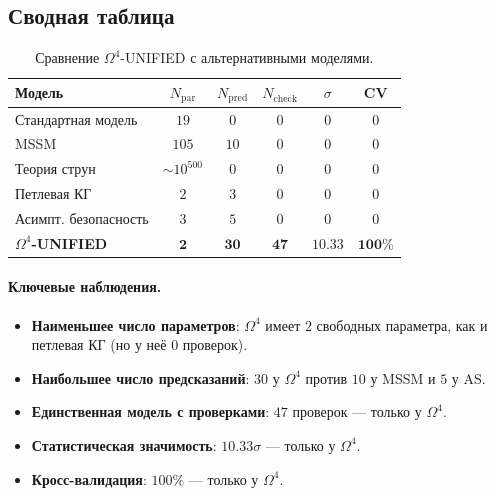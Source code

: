 \documentclass[11pt,a4paper]{article}
\newcommand{\Om}{\Omega^4}
\theoremstyle{definition}
\begin{document}
\subsection{Сводная таблица}
\label{subsec:benchmark-table}

\begin{table}[htbp]
\centering
\caption{Сравнение $\Om$-UNIFIED с альтернативными моделями.}
\label{tab:benchmark}
\begin{tabular}{lccccc}
\toprule
Модель & $N_{\text{par}}$ & $N_{\text{pred}}$ & $N_{\text{check}}$ 
& $\sigma$ & CV \\
\midrule
Стандартная модель & $19$ & $0$ & $0$ & $0$ & $0$ \\
MSSM & $105$ & $10$ & $0$ & $0$ & $0$ \\
Теория струн & $\sim 10^{500}$ & $0$ & $0$ & $0$ & $0$ \\
Петлевая КГ & $2$ & $3$ & $0$ & $0$ & $0$ \\
Асимпт. безопасность & $3$ & $5$ & $0$ & $0$ & $0$ \\
\midrule
\textbf{$\Om$-UNIFIED} & $\mathbf{2}$ & $\mathbf{30}$ & $\mathbf{47}$ 
& $\mathbf{10.33}$ & $\mathbf{100\%}$ \\
\bottomrule
\end{tabular}
\end{table}

\paragraph{Ключевые наблюдения.}
\begin{itemize}
    \item \textbf{Наименьшее число параметров}: 
          $\Om$ имеет $2$ свободных параметра, как и петлевая 
          КГ (но у неё 0 проверок).
    \item \textbf{Наибольшее число предсказаний}: 
          $30$ у $\Om$ против $10$ у MSSM и $5$ у AS.
    \item \textbf{Единственная модель с проверками}: 
          $47$ проверок — только у $\Om$.
    \item \textbf{Статистическая значимость}: 
          $10.33\sigma$ — только у $\Om$.
    \item \textbf{Кросс-валидация}: 
          $100\%$ — только у $\Om$.
\end{itemize}
\end{document}
